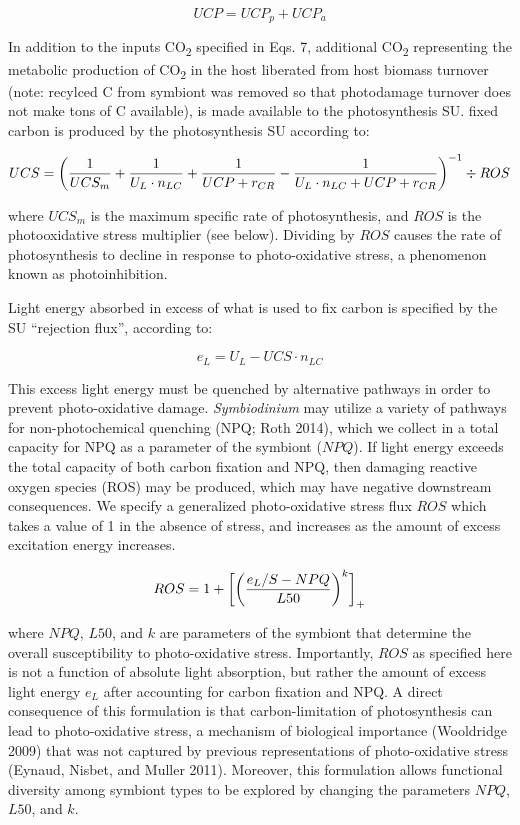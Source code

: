 \documentclass[]{elsarticle} %
\begin{document}
\begin{equation} UCP = UCP_p + UCP_a \end{equation}

In addition to the inputs CO\textsubscript{2} specified in Eqs. 7,
additional CO\textsubscript{2} representing the metabolic production of
CO\textsubscript{2} in the host liberated from host biomass turnover
(note: recylced C from symbiont was removed so that photodamage turnover
does not make tons of C available), is made available to the
photosynthesis SU. fixed carbon is produced by the photosynthesis SU
according to:

\begin{equation} UCS = \bigg({1 \over UCS_m} + {1 \over {U_L \cdot n_{LC}}} + {1 \over {UCP + r_{CR}}} - {1 \over {U_L \cdot n_{LC} + UCP + r_{CR}}}\bigg)^{-1} \div ROS \end{equation}

where \(UCS_m\) is the maximum specific rate of photosynthesis, and
\(ROS\) is the photooxidative stress multiplier (see below). Dividing by
\(ROS\) causes the rate of photosynthesis to decline in response to
photo-oxidative stress, a phenomenon known as photoinhibition.

Light energy absorbed in excess of what is used to fix carbon is
specified by the SU ``rejection flux'', according to:

\begin{equation} e_L = U_L - UCS \cdot n_{LC} \end{equation}

This excess light energy must be quenched by alternative pathways in
order to prevent photo-oxidative damage. \emph{Symbiodinium} may utilize
a variety of pathways for non-photochemical quenching (NPQ; Roth 2014),
which we collect in a total capacity for NPQ as a parameter of the
symbiont (\(NPQ\)). If light energy exceeds the total capacity of both
carbon fixation and NPQ, then damaging reactive oxygen species (ROS) may
be produced, which may have negative downstream consequences. We specify
a generalized photo-oxidative stress flux \(ROS\) which takes a value of
1 in the absence of stress, and increases as the amount of excess
excitation energy increases.

\begin{equation} ROS = 1 + \bigg[\bigg({{e_L/S - NPQ} \over L50}\bigg)^k\bigg]_+ \end{equation}

where \(NPQ\), \(L50\), and \(k\) are parameters of the symbiont that
determine the overall susceptibility to photo-oxidative stress.
Importantly, \(ROS\) as specified here is not a function of absolute
light absorption, but rather the amount of excess light energy \(e_L\)
after accounting for carbon fixation and NPQ. A direct consequence of
this formulation is that carbon-limitation of photosynthesis can lead to
photo-oxidative stress, a mechanism of biological importance (Wooldridge
2009) that was not captured by previous representations of
photo-oxidative stress (Eynaud, Nisbet, and Muller 2011). Moreover, this
formulation allows functional diversity among symbiont types to be
explored by changing the parameters \(NPQ\), \(L50\), and \(k\).
\end{document}
